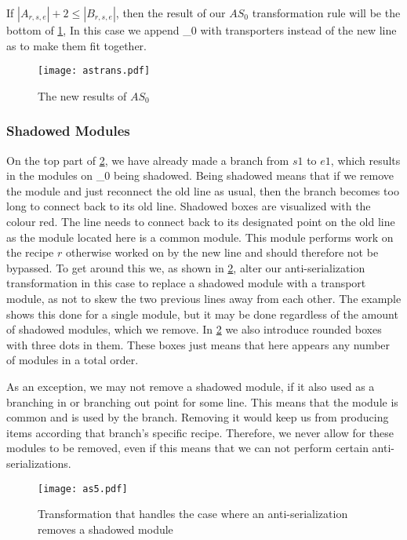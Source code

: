 If $|A_{r,s,e}| + 2 \leq |B_{r,s,e}|$,  then the result of our $AS_0$ transformation rule will be the bottom of \cref{fig:astrans}, In this case we append \Gamma_0 with transporters instead of the new line as to make them fit together.

\begin{figure}[H]
	\centering
	\texttt{[image: astrans.pdf]}
	\caption{The new results of $AS_0$}
	\label{fig:astrans}
\end{figure}

\subsubsection{Shadowed Modules}\label{sssec:shadow}
On the top part of \cref{fig:shadowexample},  we have already made a branch from $s1$ to $e1$, which results in the modules on \Gamma_0 being shadowed. Being shadowed means that if we remove the module and just reconnect the old line as usual, then the branch becomes too long to connect back to its old line. Shadowed boxes are visualized with the colour red. The line needs to connect back to its designated point on the old line as the module located here is a common module. This module  performs work on the recipe $r$ otherwise worked on by the new line and should therefore not be bypassed. To get around this we, as shown in \cref{fig:shadowexample}, alter our anti-serialization transformation in this case to replace a shadowed module with a transport module, as not to skew the two previous lines away from each other. The example shows this done for a single module, but it may be done regardless of the amount of shadowed modules, which we remove. In \cref{fig:shadowexample} we also introduce rounded boxes with three dots in them. These boxes just means that here appears any number of modules in a total order.

As an exception, we may not remove a shadowed module, if it also used as a branching in or branching out point for some line. This means that the module is common and is used by the branch. Removing it would keep us from producing items according that branch's specific recipe. Therefore, we never allow for these modules to be removed, even if this means that we can not perform certain anti-serializations.

\begin{figure}[H]
	\centering
	\texttt{[image: as5.pdf]}
	\caption{Transformation that handles the case where an anti-serialization removes a shadowed module}
	\label{fig:shadowexample}
\end{figure}

